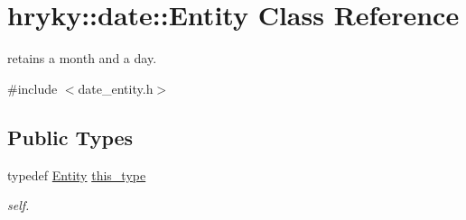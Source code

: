 \hypertarget{classhryky_1_1date_1_1_entity}{\section{hryky\-:\-:date\-:\-:Entity Class Reference}
\label{classhryky_1_1date_1_1_entity}
}


retains a month and a day.  




{\ttfamily \#include $<$date\-\_\-entity.\-h$>$}

\subsection*{Public Types}
\begin{DoxyCompactItemize}
\item 
\hypertarget{classhryky_1_1date_1_1_entity_aa89e431c521eed48992301fe010a9eaa}{typedef \hyperlink{classhryky_1_1date_1_1_entity}{Entity} \hyperlink{classhryky_1_1date_1_1_entity_aa89e431c521eed48992301fe010a9eaa}{this\-\_\-type}}\label{classhryky_1_1date_1_1_entity_aa89e431c521eed48992301fe010a9eaa}

\begin{DoxyCompactList}\small\item\em self. \end{DoxyCompactList}\end{DoxyCompactItemize}
